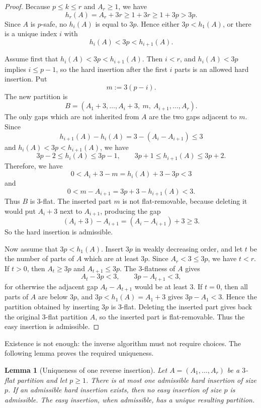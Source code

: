 \documentclass[11pt]{amsart}
\newtheorem{lemma}[theorem]{Lemma}
\theoremstyle{definition}
\theoremstyle{remark}
\begin{document}
\begin{proof}
Because \(p\le k\le r\) and \(A_r\ge1\), we have
\[
        h_r(A)=A_r+3r\ge 1+3r\ge 1+3p>3p.
\]
Since \(A\) is \(p\)-safe, no \(h_i(A)\) is equal to \(3p\).  Hence either
\(3p<h_1(A)\), or there is a unique index \(i\) with
\[
        h_i(A)<3p<h_{i+1}(A).
\]

Assume first that \(h_i(A)<3p<h_{i+1}(A)\).  Then \(i<r\), and
\(h_i(A)<3p\) implies \(i\le p-1\), so the hard insertion after the first
\(i\) parts is an allowed hard insertion.  Put
\[
        m:=3(p-i).
\]
The new partition is
\[
        B=(A_1+3,\ldots,A_i+3,\ m,\ A_{i+1},\ldots,A_r).
\]
The only gaps which are not inherited from \(A\) are the two gaps adjacent to
\(m\).  Since
\[
        h_{i+1}(A)-h_i(A)=3-(A_i-A_{i+1})\le3
\]
and \(h_i(A)<3p<h_{i+1}(A)\), we have
\[
        3p-2\le h_i(A)\le 3p-1,\qquad
        3p+1\le h_{i+1}(A)\le 3p+2.
\]
Therefore, we have
\[
        0< A_i+3-m=h_i(A)+3-3p<3
\]
and
\[
        0< m-A_{i+1}=3p+3-h_{i+1}(A)<3.
\]
Thus \(B\) is \(3\)-flat.  The inserted part \(m\) is not flat-removable, because
deleting it would put \(A_i+3\) next to \(A_{i+1}\), producing the gap
\[
        (A_i+3)-A_{i+1}=(A_i-A_{i+1})+3\ge3.
\]
So the hard insertion is admissible.

Now assume that \(3p<h_1(A)\).  Insert \(3p\) in weakly decreasing order, and
let \(t\) be the number of parts of \(A\) which are at least \(3p\).  Since
\(A_r<3\le3p\), we have \(t<r\).  If \(t>0\), then \(A_t\ge3p\) and
\(A_{t+1}\le3p\).  The \(3\)-flatness of \(A\) gives
\[
        A_t-3p<3,\qquad 3p-A_{t+1}<3,
\]
for otherwise the adjacent gap \(A_t-A_{t+1}\) would be at least \(3\).  If
\(t=0\), then all parts of \(A\) are below \(3p\), and
\(3p<h_1(A)=A_1+3\) gives \(3p-A_1<3\).  Hence the partition obtained by
inserting \(3p\) is \(3\)-flat.  Deleting the inserted part gives back the
original \(3\)-flat partition \(A\), so the inserted part is flat-removable.
Thus the easy insertion is admissible.
\end{proof}

Existence is not enough: the inverse algorithm must not require choices.  The following lemma proves the required uniqueness.

\begin{lemma}[Uniqueness of one reverse insertion]\label{lem:unique-insertion}
Let \(A=(A_1,\ldots,A_r)\) be a \(3\)-flat partition and let \(p\ge1\).
There is at most one admissible hard insertion of size \(p\).  If an admissible
hard insertion exists, then no easy insertion of size \(p\) is admissible.  The
easy insertion, when admissible, has a unique resulting partition.
\end{lemma}
\end{document}
